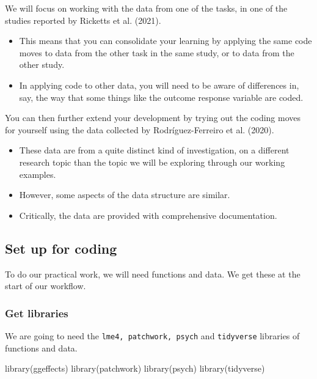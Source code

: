 \documentclass[
  letterpaper,
  DIV=11,
  numbers=noendperiod]{scrreprt}
\newenvironment{Shaded}{\begin{snugshade}}{\end{snugshade}}
\newcommand{\FunctionTok}[1]{\textcolor[rgb]{0.28,0.35,0.67}{#1}}
\newcommand{\NormalTok}[1]{\textcolor[rgb]{0.00,0.23,0.31}{#1}}
\providecommand{\tightlist}{%
  \setlength{\itemsep}{0pt}\setlength{\parskip}{0pt}}\usepackage{longtable,booktabs,array}
\begin{document}
We will focus on working with the data from one of the tasks, in one of
the studies reported by Ricketts et al. (2021).

\begin{itemize}
\tightlist
\item
  This means that you can consolidate your learning by applying the same
  code moves to data from the other task in the same study, or to data
  from the other study.
\item
  In applying code to other data, you will need to be aware of
  differences in, say, the way that some things like the outcome
  response variable are coded.
\end{itemize}

You can then further extend your development by trying out the coding
moves for yourself using the data collected by Rodríguez-Ferreiro et al.
(2020).

\begin{itemize}
\tightlist
\item
  These data are from a quite distinct kind of investigation, on a
  different research topic than the topic we will be exploring through
  our working examples.
\item
  However, some aspects of the data structure are similar.
\item
  Critically, the data are provided with comprehensive documentation.
\end{itemize}

\hypertarget{sec-set-up}{%
\subsection{Set up for coding}\label{sec-set-up}}

To do our practical work, we will need functions and data. We get these
at the start of our workflow.

\hypertarget{sec-libraries}{%
\subsubsection{Get libraries}\label{sec-libraries}}

We are going to need the \texttt{lme4,\ patchwork,\ psych} and
\texttt{tidyverse} libraries of functions and data.

\begin{Shaded}
\begin{Highlighting}[]
\FunctionTok{library}\NormalTok{(ggeffects)}
\FunctionTok{library}\NormalTok{(patchwork)}
\FunctionTok{library}\NormalTok{(psych)}
\FunctionTok{library}\NormalTok{(tidyverse)}
\end{Highlighting}
\end{Shaded}
\end{document}

